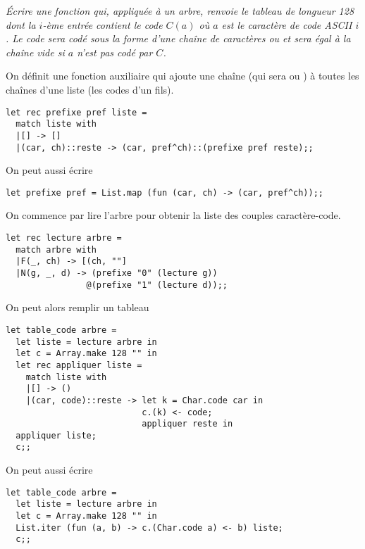 \begin{Exercise}[title = Table de codage]\it 
Écrire une fonction  qui, appliquée à un arbre, renvoie le tableau de longueur
128 dont la $i$-ème entrée contient le code $C(a)$ où $a$ est le caractère de code ASCII $i$.
Le code sera codé sous la forme d'une chaîne de caractères  ou  et sera égal à la chaîne vide si $a$ n'est pas codé par $C$.
\end{Exercise}
\begin{Answer}
On définit une fonction auxiliaire qui ajoute une chaîne (qui sera  ou ) à toutes les chaînes d'une liste (les codes d'un fils).
\begin{lstlisting}
let rec prefixe pref liste =
  match liste with
  |[] -> []
  |(car, ch)::reste -> (car, pref^ch)::(prefixe pref reste);;
\end{lstlisting}

On peut aussi écrire
\begin{lstlisting}
let prefixe pref = List.map (fun (car, ch) -> (car, pref^ch));;
\end{lstlisting}

On commence par lire l'arbre pour obtenir la liste des couples caractère-code.
\begin{lstlisting}
let rec lecture arbre = 
  match arbre with
  |F(_, ch) -> [(ch, ""]
  |N(g, _, d) -> (prefixe "0" (lecture g))
                @(prefixe "1" (lecture d));;
\end{lstlisting}
On peut alors remplir un tableau

\begin{lstlisting}
let table_code arbre =
  let liste = lecture arbre in
  let c = Array.make 128 "" in
  let rec appliquer liste = 
    match liste with
    |[] -> ()
    |(car, code)::reste -> let k = Char.code car in
                           c.(k) <- code;
                           appliquer reste in
  appliquer liste;
  c;;
\end{lstlisting}

On peut aussi écrire
\begin{lstlisting}
let table_code arbre =
  let liste = lecture arbre in
  let c = Array.make 128 "" in
  List.iter (fun (a, b) -> c.(Char.code a) <- b) liste;
  c;;
\end{lstlisting}

\end{Answer}
